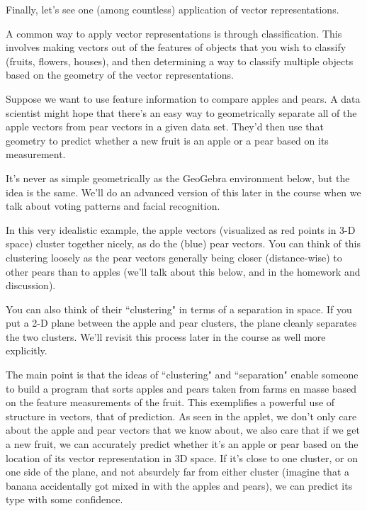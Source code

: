 \documentclass{ximera}
\begin{document}
\begin{exploration}

Finally, let's see one (among countless) application of vector representations.

  A common way to apply vector representations is through classification. This involves making vectors out of the features of objects that you wish to classify (fruits, flowers, houses), and then determining a way to classify multiple objects based on the geometry of the vector representations.


\begin{example}

    Suppose we want to use feature information to compare apples and pears. A data scientist might hope that there's an easy way to geometrically separate all of the apple vectors from pear vectors in a given data set. They'd then use that geometry to predict whether a new fruit is an apple or a pear based on its measurement. 

    It's never as simple geometrically as the GeoGebra environment below, but the idea is the same. We'll do an advanced version of this later in the course when we talk about voting patterns and facial recognition.

    

    \begin{center}
    \end{center}

    In this very idealistic example, the apple vectors (visualized as red points in 3-D space) cluster together nicely, as do the (blue) pear vectors. You can think of this clustering loosely as the pear vectors generally being closer (distance-wise) to other pears than to apples (we'll talk about this below, and in the homework and discussion).
    
    You can also think of their ``clustering" in terms of a separation in space. If you put a 2-D plane between the apple and pear clusters, the plane cleanly separates the two clusters. We'll revisit this process later in the course as well more explicitly. 
    
    The main point is that the ideas of ``clustering" and ``separation" enable someone to build a program that sorts apples and pears taken from farms en masse based on the feature measurements of the fruit. This exemplifies a powerful use of structure in vectors, that of prediction. As seen in the applet, we don't only care about the apple and pear vectors that we know about, we also care that if we get a new fruit, we can accurately predict whether it's an apple or pear based on the location of its vector representation in 3D space. If it's close to one cluster, or on one side of the plane, and not absurdely far from either cluster (imagine that a banana accidentally got mixed in with the apples and pears), we can predict its type with some confidence.


\end{example}
\end{exploration}
\end{document}
